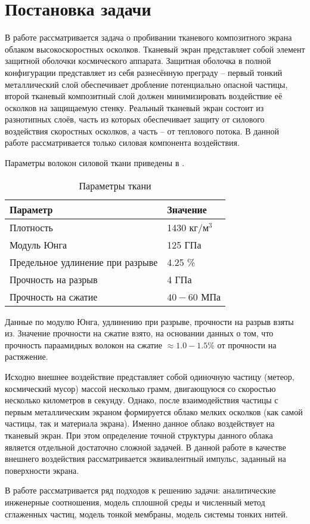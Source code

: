 \section{Постановка задачи}\label{sec:intro-problem}

В работе рассматривается задача о пробивании тканевого композитного экрана облаком высокоскоростных осколков. 
Тканевый экран представляет собой элемент защитной оболочки космического аппарата. Защитная оболочка в полной 
конфигурации представляет из себя разнесённую преграду -- первый тонкий металлический слой обеспечивает дробление 
потенциально опасной частицы, второй тканевый композитный слой должен минимизировать воздействие её осколков на 
защищаемую стенку. Реальный тканевый экран состоит из разнотипных слоёв, часть из которых обеспечивает 
защиту от силового воздействия скоростных осколков, а часть -- от теплового потока. В данной работе 
рассматривается только силовая компонента воздействия.

Параметры волокон силовой ткани приведены в .

\begin{table}[h]
    \centering
    \begin{tabular}{|l|l|}
        \hline
        Параметр & Значение      \\ \hline
        Плотность & 1430 $кг/м^3$ \\ \hline
        Модуль Юнга & 125 ГПа       \\ \hline
        Предельное удлинение при разрыве & 4.25 \%       \\ \hline
        Прочность на разрыв & 4 ГПа         \\ \hline
        Прочность на сжатие & $40-60$ МПа     \\ \hline
    \end{tabular}
    \caption{Параметры ткани}\label{tbl:kevlar-params}
\end{table}

Данные по модулю Юнга, удлинению при разрыве, прочности на разрыв взяты из\cite{perepelkin2009,mikhailin2013}.
Значение прочности на сжатие взято, на основании данных\cite{papkov1986} о том, что прочность параамидных волокон
на сжатие $\approx 1.0 - 1.5 \%$ от прочности на растяжение.

Исходно внешнее воздействие представляет собой одиночную частицу (метеор, космический мусор) массой несколько грамм, 
двигающуюся со скоростью несколько километров в секунду. Однако, после взаимодействия частицы с первым металлическим 
экраном формируется облако мелких осколков (как самой частицы, так и материала экрана). Именно данное облако воздействует 
на тканевый экран. При этом определение точной структуры данного облака является отдельной достаточно сложной задачей. 
В данной работе в качестве внешнего воздействия рассматривается эквивалентный импульс, заданный на поверхности экрана.

В работе рассматривается ряд подходов к решению задачи: 
аналитические инженерные соотношения, 
модель сплошной среды и численный метод сглаженных частиц, 
модель тонкой мембраны, 
модель системы тонких нитей.


